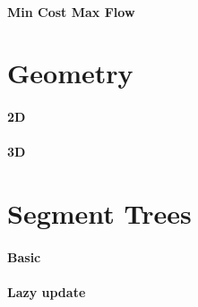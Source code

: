 \documentclass[a4paper]{article}
\begin{document}
\paragraph{Min Cost Max Flow} \hfill

\section{Geometry}
\paragraph{2D} \hfill

\paragraph{3D} \hfill

\section{Segment Trees}
\paragraph{Basic} \hfill

\paragraph{Lazy update} \hfill

\end{document}
